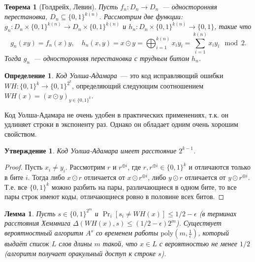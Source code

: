 \documentclass[12pt]{article}
\newcommand{\bits}{\{0,1\}}
\newcommand{\poly}{\mathrm{poly}}
\theoremstyle{definition}
\newtheorem{definition}{Определение}[section]
\theoremstyle{plain}
\newtheorem{theorem}{Теорема}[section]
\newtheorem{lemma}{Лемма}[section]
\newtheorem{statement}{Утверждение}[section]
\theoremstyle{remark}
\begin{document}
\begin{theorem}[Голдрейх, Левин]
Пусть $f_n:D_n\to D_n$~--- односторонняя перестановка, $D_n\subseteq \bits^{k(n)}$.
Рассмотрим две функции: $g_n: D_n\times \bits^{k(n)}\to D_n\times \bits^{k(n)}$ и $h_n: D_n\times \bits^{k(n)}\to \bits$, такие что
$$g_n(xy)= f_n(x)y,\quad h_n(x,y) = x\odot y = \bigoplus_{i=1}^{k(n)} x_iy_i = \sum_{i=1}^{k(n)} x_iy_i\mod2.$$ 
Тогда $g_n$~--- односторонняя перестановка
с трудным битом $h_n$.
\end{theorem}

\begin{definition}
\emph{Код Уолша-Адамара}~--- это код исправляющий ошибки $WH: \bits^k\to\bits^{2^k}$,
определяющий следующим соотношением $WH(x)=(x\odot y)_{y\in\bits^{k}}$.
\end{definition}
Код Уолша-Адамара не очень удобен в практических применениях, 
т.к. он удлиняет строки в экспоненту раз.
Однако он обладает одним очень хорошим свойством.
\begin{statement}
Код Уолша-Адамара имеет расстояние $2^{k-1}$.
\end{statement}
\begin{proof}
Пусть $x_i\neq y_i$. Рассмотрим $r$ и $r^{\oplus i}$, где $r,r^{\oplus i}\in\bits^{k}$ и отличаются только в бите $i$.
Тогда либо $x\odot r$ отличается от $x\odot r^{\oplus i}$, либо $y\odot r$ отличается от $y\odot r^{\oplus i}$.
Т.е. все $\bits^k$ можно разбить на пары, различающиеся в одном бите, то все пары строк имеют коды, отличающиеся
ровно в половине всех битов.
\end{proof}

\begin{lemma}\label{lm:WH-list-decoding}
Пусть $s\in\bits^{2^m}$ и $\Pr_i[s_i \neq WH(x)] \le 1/2 - \epsilon$ (в терминах расстояния Хеммнига $\Delta(WH(x), s) \le (1/2 - \epsilon)2^m$). Существует вероятностный алгоритм $A^s$ со временем работы $\poly(m, \frac{1}{\epsilon})$, который выдаёт
список $L$ слов длины $m$ такой, что $x\in L$ с вероятностью не менее $1/2$ (алгоритм получает оракульный доступ к строке $s$).
\end{lemma}
\end{document}
